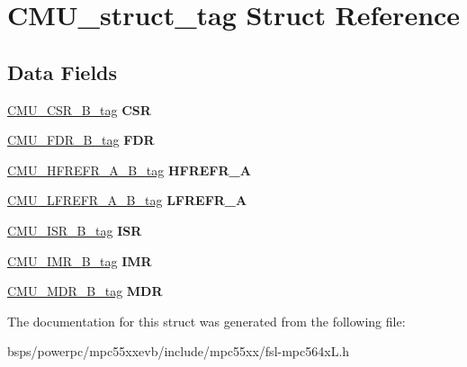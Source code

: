 \hypertarget{structCMU__struct__tag}{}\section{C\+M\+U\+\_\+struct\+\_\+tag Struct Reference}
\label{structCMU__struct__tag}
\subsection*{Data Fields}
\begin{DoxyCompactItemize}
\item 
\mbox{\label{structCMU__struct__tag_a871ac45a4b0917828e344c8e2bf52a44}} 
\mbox{\hyperlink{unionCMU__CSR__32B__tag}{C\+M\+U\+\_\+\+C\+S\+R\+\_\+B\+\_\+tag}} {\bfseries C\+SR}
\item 
\mbox{\label{structCMU__struct__tag_a99a6d31cf2cf647c1948fd3ba3d5718c}} 
\mbox{\hyperlink{unionCMU__FDR__32B__tag}{C\+M\+U\+\_\+\+F\+D\+R\+\_\+B\+\_\+tag}} {\bfseries F\+DR}
\item 
\mbox{\label{structCMU__struct__tag_a9c5785b683b68d7a0949f626eada774e}} 
\mbox{\hyperlink{unionCMU__HFREFR__A__32B__tag}{C\+M\+U\+\_\+\+H\+F\+R\+E\+F\+R\+\_\+\+A\+\_\+B\+\_\+tag}} {\bfseries H\+F\+R\+E\+F\+R\+\_\+A}
\item 
\mbox{\label{structCMU__struct__tag_a9acd31c5dbf08e765b274c5186e51b06}} 
\mbox{\hyperlink{unionCMU__LFREFR__A__32B__tag}{C\+M\+U\+\_\+\+L\+F\+R\+E\+F\+R\+\_\+\+A\+\_\+B\+\_\+tag}} {\bfseries L\+F\+R\+E\+F\+R\+\_\+A}
\item 
\mbox{\label{structCMU__struct__tag_ae4acd6f6b956e4dfa6226e97cfe3e8f0}} 
\mbox{\hyperlink{unionCMU__ISR__32B__tag}{C\+M\+U\+\_\+\+I\+S\+R\+\_\+B\+\_\+tag}} {\bfseries I\+SR}
\item 
\mbox{\label{structCMU__struct__tag_a41cdd3cfcf675491fae2725dbb57c381}} 
\mbox{\hyperlink{unionCMU__IMR__32B__tag}{C\+M\+U\+\_\+\+I\+M\+R\+\_\+B\+\_\+tag}} {\bfseries I\+MR}
\item 
\mbox{\label{structCMU__struct__tag_ab0099ebac88b5f77daf69ff1a0b542bb}} 
\mbox{\hyperlink{unionCMU__MDR__32B__tag}{C\+M\+U\+\_\+\+M\+D\+R\+\_\+B\+\_\+tag}} {\bfseries M\+DR}
\end{DoxyCompactItemize}


The documentation for this struct was generated from the following file\+:\begin{DoxyCompactItemize}
\item 
bsps/powerpc/mpc55xxevb/include/mpc55xx/fsl-\/mpc564x\+L.\+h\end{DoxyCompactItemize}
